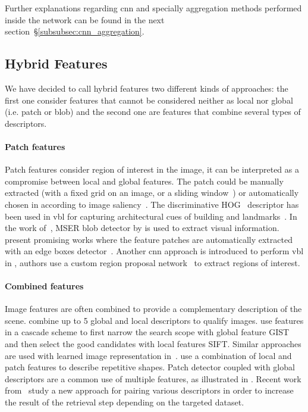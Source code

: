 			Further explanations regarding \ac{cnn} and specially aggregation methods performed inside the network can be found in the next section~\S\ref{subsubsec:cnn_aggregation}.

	\subsection{Hybrid Features}
	\label{subsec:hybrid_feature}
		We have decided to call hybrid features two different kinds of approaches: the first one consider features that cannot be considered neither as local nor global (i.e. patch or blob) and the second one are features that combine several types of descriptors.
		\paragraph{Patch features}
			Patch features consider region of interest in the image, it can be interpreted as a compromise between local and global features. The patch could be manually extracted (with a fixed grid on an image, or a sliding window~\citep{Dalal2005}) or automatically chosen in according to image saliency~\citep{Matas2004}. The discriminative HOG~\citep{Dalal2005} descriptor has been used in \ac{vbl} for capturing architectural cues of building and landmarks~\citep{Shrivastava2011, Aubry2014, McManus2014,Morago2016}. In the work of~\citep{Nister2006,Kim2015}, MSER blob detector by \citet{Matas2004} is used to extract visual information. \citet{Sunderhauf2015a} present promising works where the feature patches are automatically extracted with an edge boxes detector~\citep{Zitnick2014}. Another \ac{cnn} approach is introduced to perform \ac{vbl} in \citep{Gordo2016}, authors use a custom region proposal network~\citep{Ren2015} to extract regions of interest.
			
		\paragraph{Combined features}
			Image features are often combined to provide a complementary description of the scene. \citet{Hays2008} combine up to 5 global and local descriptors to qualify images. \citet{Azzi2016} use features in a cascade scheme to first narrow the search scope with global feature GIST and then select the good candidates with local features SIFT. Similar approaches are used with learned image representation in~\citep{Sarlin2018a,Sarlin2018,Rocco2018,Sattler2017,Piasco2019a,Taira2018,Dusmanu2019}. \citet{Morago2016} use a combination of local and patch features to describe repetitive shapes. Patch detector coupled with global descriptors are a common use of multiple features, as illustrated in \citep{Kim2015,Gordo2016,Sunderhauf2015a,Yan2016}. Recent work from~\citet{Bhowmik2017} study a new approach for pairing various descriptors in order to increase the result of the retrieval step depending on the targeted dataset.
						
